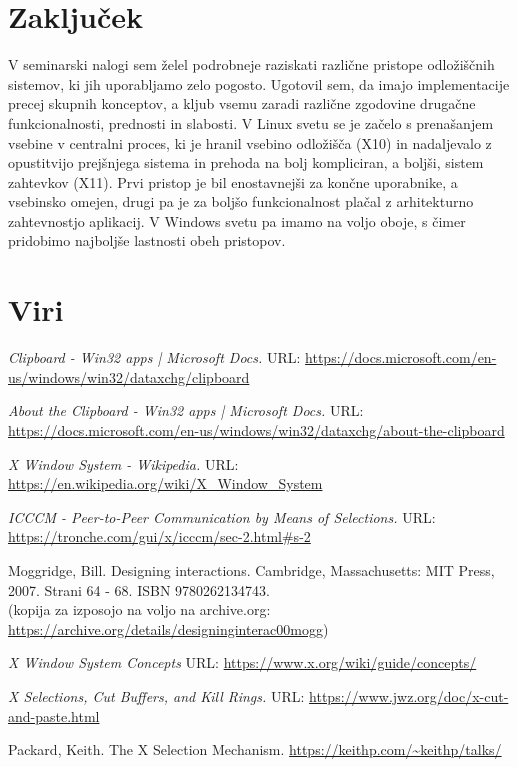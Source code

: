 \documentclass[12pt, A4]{article}
\begin{document}
	\section{Zaključek}
	V seminarski nalogi sem želel podrobneje raziskati različne pristope odložiščnih sistemov, ki jih uporabljamo zelo pogosto. Ugotovil sem, da imajo implementacije precej skupnih konceptov, a kljub vsemu zaradi različne zgodovine drugačne funkcionalnosti, prednosti in slabosti. V Linux svetu se je začelo s prenašanjem vsebine v centralni proces, ki je hranil vsebino odložišča (X10) in nadaljevalo z opustitvijo prejšnjega sistema in prehoda na bolj kompliciran, a boljši, sistem zahtevkov (X11). Prvi pristop je bil enostavnejši za končne uporabnike, a vsebinsko omejen, drugi pa je za boljšo funkcionalnost plačal z arhitekturno zahtevnostjo aplikacij. V Windows svetu pa imamo na voljo oboje, s čimer pridobimo najboljše lastnosti obeh pristopov.
	
	
	\pagebreak
	\section{Viri}
	\begin{thebibliography}{10}
		\textit{Clipboard - Win32 apps | Microsoft Docs.}
		URL: \url{https://docs.microsoft.com/en-us/windows/win32/dataxchg/clipboard}
		
		\textit{About the Clipboard - Win32 apps | Microsoft Docs.}
		URL: \url{https://docs.microsoft.com/en-us/windows/win32/dataxchg/about-the-clipboard}
		
		\textit{X Window System - Wikipedia.}
		URL: \url{https://en.wikipedia.org/wiki/X_Window_System}
		
		\textit{ICCCM - Peer-to-Peer Communication by Means of Selections.}
		URL: \url{https://tronche.com/gui/x/icccm/sec-2.html#s-2}
		
		Moggridge, Bill. Designing interactions. Cambridge, Massachusetts: MIT Press, 2007. Strani 64 - 68. ISBN 9780262134743. \\
		(kopija za izposojo na voljo na archive.org: \url{https://archive.org/details/designinginterac00mogg})
		
		\textit{X Window System Concepts}
		URL: \url{https://www.x.org/wiki/guide/concepts/}
		
		\textit{X Selections, Cut Buffers, and Kill Rings.}
		URL: \url{https://www.jwz.org/doc/x-cut-and-paste.html}
		
		Packard, Keith. The X Selection Mechanism. \url{https://keithp.com/~keithp/talks/}
	\end{thebibliography}
	
\end{document}
